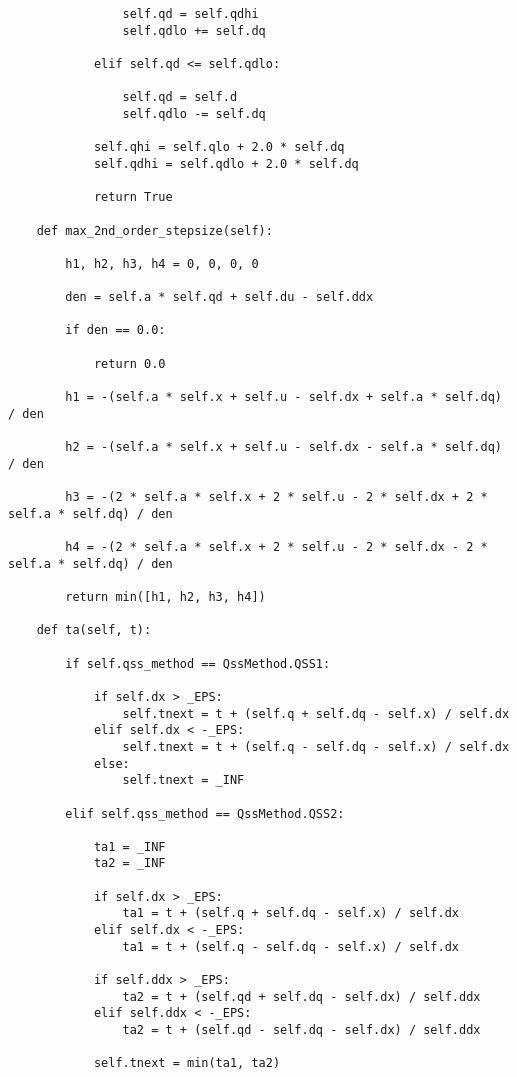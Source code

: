 \begin{lstlisting}
                self.qd = self.qdhi
                self.qdlo += self.dq

            elif self.qd <= self.qdlo:

                self.qd = self.d
                self.qdlo -= self.dq

            self.qhi = self.qlo + 2.0 * self.dq
            self.qdhi = self.qdlo + 2.0 * self.dq

            return True

    def max_2nd_order_stepsize(self):

        h1, h2, h3, h4 = 0, 0, 0, 0

        den = self.a * self.qd + self.du - self.ddx

        if den == 0.0:

            return 0.0

        h1 = -(self.a * self.x + self.u - self.dx + self.a * self.dq) / den

        h2 = -(self.a * self.x + self.u - self.dx - self.a * self.dq) / den

        h3 = -(2 * self.a * self.x + 2 * self.u - 2 * self.dx + 2 * self.a * self.dq) / den

        h4 = -(2 * self.a * self.x + 2 * self.u - 2 * self.dx - 2 * self.a * self.dq) / den

        return min([h1, h2, h3, h4])

    def ta(self, t):

        if self.qss_method == QssMethod.QSS1:

            if self.dx > _EPS:
                self.tnext = t + (self.q + self.dq - self.x) / self.dx
            elif self.dx < -_EPS:
                self.tnext = t + (self.q - self.dq - self.x) / self.dx
            else:
                self.tnext = _INF

        elif self.qss_method == QssMethod.QSS2:

            ta1 = _INF
            ta2 = _INF

            if self.dx > _EPS:
                ta1 = t + (self.q + self.dq - self.x) / self.dx
            elif self.dx < -_EPS:
                ta1 = t + (self.q - self.dq - self.x) / self.dx

            if self.ddx > _EPS:
                ta2 = t + (self.qd + self.dq - self.dx) / self.ddx
            elif self.ddx < -_EPS:
                ta2 = t + (self.qd - self.dq - self.dx) / self.ddx

            self.tnext = min(ta1, ta2)


\end{lstlisting}
